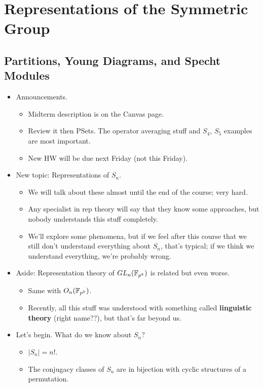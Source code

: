 \documentclass[../notes.tex]{subfiles}
\begin{document}
\chapter{Representations of the Symmetric Group}
\section{Partitions, Young Diagrams, and Specht Modules}
\begin{itemize}
    \item {}Announcements.
    \begin{itemize}
        \item Midterm description is on the Canvas page.
        \item Review it then PSets. The operator averaging stuff and $S_4$, $S_5$ examples are most important.
        \item New HW will be due next Friday (not this Friday).
    \end{itemize}
    \item New topic: Representations of $S_n$.
    \begin{itemize}
        \item We will talk about these almost until the end of the course; very hard.
        \item Any specialist in rep theory will say that they know some approaches, but nobody understands this stuff completely.
        \item We'll explore some phenomena, but if we feel after this course that we still don't understand everything about $S_n$, that's typical; if we think we understand everything, we're probably wrong.
    \end{itemize}
    \item Aside: Representation theory of $GL_n(\mathbb{F}_{p^k})$ is related but even worse.
    \begin{itemize}
        \item Same with $O_n(\mathbb{F}_{p^k})$.
        \item Recently, all this stuff was understood with something called \textbf{linguistic theory} (right name??), but that's far beyond us.
    \end{itemize}
    \item Let's begin. What do we know about $S_n$?
    \begin{itemize}
        \item $|S_n|=n!$.
        \item The conjugacy classes of $S_n$ are in bijection with cyclic structures of a permutation.

\end{itemize}
\end{itemize}
\end{document}
